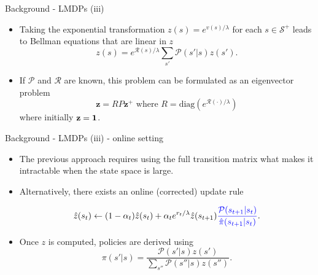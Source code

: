 \documentclass{beamer}
\theoremstyle{mystyle}
\newcommand{\cP}{\mathcal{P}}
\newcommand{\cR}{\mathcal{R}}
\newcommand{\cS}{\mathcal{S}}
\begin{document}
\begin{frame}{Background - LMDPs (iii)}
    
    \begin{itemize}
         \item Taking the exponential transformation $z(s)=e^{v(s)/\lambda}$ for each $s\in\cS^+$ leads to Bellman equations that are linear in $z$ \[ z(s) = e^{\cR(s)/\lambda} \sum_{s'}\cP(s'|s)z(s'). \]
         \item If $\cP$ and $\cR$ are known, this problem can be formulated as an eigenvector problem \[ \mathbf{z} = R P \mathbf{z^+} \text{  where  } R=\text{diag}(e^{\cR(\cdot)/\lambda}) \] where initially 
         $\mathbf z  = \bf 1$.
        \end{itemize}
\end{frame}

\begin{frame}{Background - LMDPs (iii) - online setting}

\begin{itemize}
\item The previous approach requires using the full transition matrix what makes it {\color{blue} intractable} when the state space is large.
\item Alternatively, there exists an online {\color{blue} (corrected)} update rule  
        
         \[ \hat{z}(s_t) \leftarrow (1-\alpha_t) \hat{z}(s_t) + \alpha_t e^{r_t/\lambda}\hat{z}(s_{t+1}) {\color{blue} \frac {\cP(s_{t+1}|s_t)} {\hat{\pi}(s_{t+1}|s_t)}}. \]
         
\item Once $z$ is computed, policies are derived using \[ \pi(s'|s) = \frac {\cP(s'|s)z(s')} {\sum_{s''} \cP(s''|s)z(s'')}. \]
\end{itemize}
\end{frame}
\end{document}
